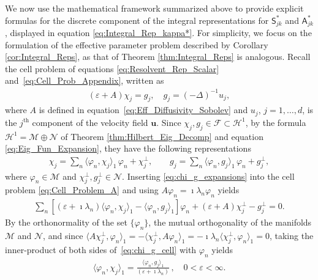 \documentclass[leqno,onefignum,onetabnum]{siamltex1213}
\newcommand{\Mc}{\mathcal{M}}
\newcommand{\Nc}{\mathcal{N}}
\newcommand{\Sm}{\mathsf{S}}
\newcommand{\Am}{\mathsf{A}}
\newcommand{\Hs}{\mathscr{H}}
\newcommand{\Fs}{\mathscr{F}}
\newcommand{\vecu}{\boldsymbol{u}}
\begin{document}
We now use the mathematical framework summarized above to provide
explicit formulas for the discrete component of the integral
representations for $\Sm^*_{jk}$ and $\Am^*_{jk}$, displayed in equation
\eqref{eq:Integral_Rep_kappa*}. For simplicity, we focus on the
formulation of the effective parameter problem described by Corollary
\ref{cor:Integral_Reps}, as that of Theorem \ref{thm:Integral_Reps} is
analogous. Recall the cell problem of equations
\eqref{eq:Resolvent_Rep_Scalar} and~\eqref{eq:Cell_Prob_Appendix}, 
written as 
% 
\begin{align}\label{eq:Cell_Problem_A}
  (\varepsilon+A)\chi_j=g_j, \quad g_j=(-\Delta)^{-1}u_j,
\end{align}
%
where $A$ is defined in equation~\eqref{eq:Eff_Diffusivity_Sobolev} 
and $u_j$, $j=1,\ldots,d$, is the $j^{\text{th}}$ component of the velocity field
$\vecu $. Since $\chi_j,g_j\in\Fs\subset\Hs^1$, by the formula
$\Hs^1=\Mc\oplus\Nc$ of Theorem \ref{thm:Hilbert_Eig_Decomp} and equation
\eqref{eq:Eig_Fun_Expansion}, they have the following representations    
%
\begin{align}\label{eq:chi_g_expansions}
  \chi_j=\sum_n\langle\varphi_n,\chi_j\rangle_1\,\varphi_n +\chi_j^\perp, \qquad  g_j=\sum_n\langle\varphi_n,g_j\rangle_1\,\varphi_n +g_j^\perp,
\end{align}
%
where $\varphi_n\in\Mc$ and $\chi_j^\perp,g_j^\perp\in\Nc$. Inserting
\eqref{eq:chi_g_expansions} into the cell problem
\eqref{eq:Cell_Problem_A} and using $A\varphi_n=\imath\lambda_n\varphi_n$ yields
%
\begin{align}\label{eq:chi_g_cell}
  \sum_n[(\varepsilon+\imath\lambda_n)\langle\varphi_n,\chi_j\rangle_1-\langle\varphi_n,g_j\rangle_1]\varphi_n+(\varepsilon+A)\chi_j^\perp-g_j^\perp=0.
\end{align}
%
By the orthonormality of the set $\{\varphi_n\}$, the mutual orthogonality of
the manifolds $\Mc$ and $\Nc$, and since
$\langle A\chi_j^\perp,\varphi_n\rangle_1=-\langle\chi_j^\perp,A\varphi_n\rangle_1=-\imath\lambda_n\langle\chi_j^\perp,\varphi_n\rangle_1=0$, taking the
inner-product of both sides of~\eqref{eq:chi_g_cell} with $\varphi_n$ yields   
%
\begin{align}\label{eq:Coefficients}
  \langle\varphi_n,\chi_j\rangle_1=\frac{\langle\varphi_n,g_j\rangle_1}{(\varepsilon+\imath\lambda_n)}\,, \quad
  0<\varepsilon<\infty.
\end{align}
%
\end{document}
